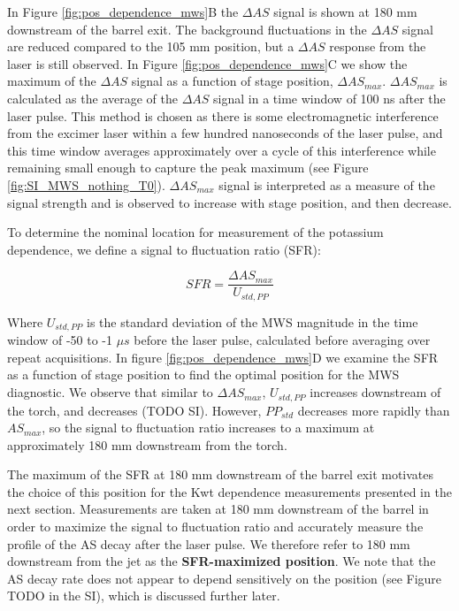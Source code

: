 In Figure \ref{fig:pos_dependence_mws}B the $\Delta AS$ signal is shown at 180 mm downstream of the barrel exit. The background fluctuations in the $\Delta AS$ signal are reduced compared to the 105 mm position, but a $\Delta AS$ response from the laser is still observed. In Figure \ref{fig:pos_dependence_mws}C we show the maximum of the $\Delta AS$ signal as a function of stage position, $\Delta AS_{max}$. $\Delta AS_{max}$ is calculated as the average of the $\Delta AS$ signal in a time window of 100 ns after the laser pulse. This method is chosen as there is some electromagnetic interference from the excimer laser within a few hundred nanoseconds of the laser pulse, and this time window averages approximately over a cycle of this interference while remaining small enough to capture the peak maximum (see Figure \ref*{fig:SI_MWS_nothing_T0}). $\Delta AS_{max}$ signal is interpreted as a measure of the signal strength and is observed to increase with stage position, and then decrease.

To determine the nominal location for measurement of the potassium dependence, we define a signal to fluctuation ratio (SFR): 

\begin{equation}
    \label{eq:sfr}
    SFR = \frac{\Delta AS_{max}}{U_{std,PP}}
\end{equation}

Where $U_{std,PP}$ is the standard deviation of the MWS magnitude in the time window of -50 to -1 $\mu s$ before the laser pulse, calculated before averaging over repeat acquisitions.  In figure \ref{fig:pos_dependence_mws}D we examine the SFR as a function of stage position to find the optimal position for the MWS diagnostic. We observe that similar to $\Delta AS_{max}$, $U_{std,PP}$ increases downstream of the torch, and decreases (TODO SI). However, $PP_{std}$ decreases more rapidly than $AS_{max}$, so the signal to fluctuation ratio increases to a maximum at approximately 180 mm downstream from the torch. 

The maximum of the SFR at 180 mm downstream of the barrel exit motivates the choice of this position for the Kwt dependence measurements presented in the next section. Measurements are taken at 180 mm downstream of the barrel in order to maximize the signal to fluctuation ratio and accurately measure the profile of the AS decay after the laser pulse. We therefore refer to 180 mm downstream from the jet as the \textbf{SFR-maximized position}. We note that the AS decay rate does not appear to depend sensitively on the position (see Figure TODO in the SI), which is discussed further later. 

